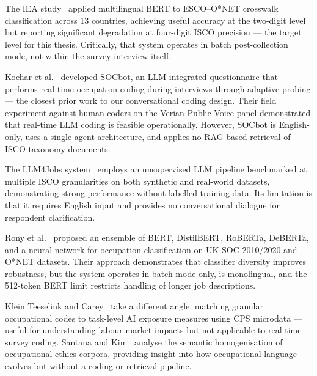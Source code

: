 The IEA study~\cite{iea2024occupationcoding} applied multilingual BERT to
ESCO--O*NET crosswalk classification across 13 countries, achieving useful
accuracy at the two-digit level but reporting significant degradation at
four-digit ISCO precision --- the target level for this thesis.
Critically, that system operates in batch post-collection mode, not within
the survey interview itself.

\noindent Kochar et al.~\cite{kochar2025socbot} developed SOCbot, an
LLM-integrated questionnaire that performs real-time occupation coding during
interviews through adaptive probing --- the closest prior work to our
conversational coding design.
Their field experiment against human coders on the Verian Public Voice panel
demonstrated that real-time LLM coding is feasible operationally.
However, SOCbot is English-only, uses a single-agent architecture, and
applies no RAG-based retrieval of ISCO taxonomy documents.

The LLM4Jobs system~\cite{anon2025llm4jobs} employs an unsupervised LLM
pipeline benchmarked at multiple ISCO granularities on both synthetic and
real-world datasets, demonstrating strong performance without labelled
training data.
Its limitation is that it requires English input and provides no conversational
dialogue for respondent clarification.

\noindent Rony et al.~\cite{rony2025socclassifier} proposed an ensemble of
BERT, DistilBERT, RoBERTa, DeBERTa, and a neural network for occupation
classification on UK SOC 2010/2020 and O*NET datasets.
Their approach demonstrates that classifier diversity improves robustness, but
the system operates in batch mode only, is monolingual, and the 512-token
BERT limit restricts handling of longer job descriptions.

Klein Teeselink and Carey~\cite{teeselink2026automation} take a different
angle, matching granular occupational codes to task-level AI exposure measures
using CPS microdata --- useful for understanding labour market impacts but not
applicable to real-time survey coding.
Santana and Kim~\cite{santana2026ethics} analyse the semantic homogenisation
of occupational ethics corpora, providing insight into how occupational language
evolves but without a coding or retrieval pipeline.

